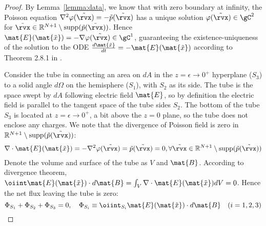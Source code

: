 \begin{proof}

{By Lemma~\ref{lemma:data}, we know that with zero boundary at infinity, the Poisson equation $\nabla^2\varphi(\tilde{\rvx})=-\tilde{p}(\tilde{\rvx})$ has a unique solution $\varphi(\tilde{\rvx}) \in \gC^2$ for $\tilde{\rvx} \in \mathbb{R}^{N+1} \setminus \textrm{supp}(\tilde{p}(\tilde{\rvx}))$. Hence $\mat{E}(\mat{\tilde{x}})= -\nabla \varphi(\tilde{\rvx}) \in \gC^1$, guaranteeing the existence-uniqueness of the solution to the ODE $\frac{d\mat{\tilde{x}}}{dt}=-\mat{E}(\mat{\tilde{x}})$ according to Theorem 2.8.1 in \cite{Ricardo2002AMI}.}

Consider the tube in  connecting an area on $dA$ in the $z=\epsilon\to 0^+$ hyperplane ($S_3$) to a solid angle $d\Omega$ on the hemisphere ($S_1$), with $S_2$ as its side. The tube is the space swept by $dA$ following electric field $\mat{E}$, so by definition the electric field is parallel to the tangent space of the tube sides $S_2$. The bottom of the tube $S_3$ is located at $z=\epsilon\to 0^+$, a bit above the $z=0$ plane, so the tube does not enclose any charges.  We note that the divergence of Poisson field is zero in $\mathbb{R}^{N+1} \setminus \textrm{supp}(\tilde{p}(\tilde{\rvx}))$:
\begin{align*}
    \nabla\cdot \mat{E}(\mat{\tilde{x}}) = -\nabla^2\varphi(\tilde{\rvx})=\tilde{p}(\tilde{\rvx})=0, \forall \tilde{\rvx} \in \mathbb{R}^{N+1} \setminus \textrm{supp}(\tilde{p}(\tilde{\rvx}))
\end{align*}
Denote the volume and surface of the tube as $V$ and $\mat{B}$. According to divergence theorem, $ \oiint \mat{E}(\mat{\tilde{x}})\cdot d\mat{B}=\int_V \nabla\cdot \mat{E}(\mat{\tilde{x}}) dV=0$. Hence the net flux leaving the tube is zero:
\begin{equation}\label{eq:tube_zeronetflux}
    \Phi_{S_1} + \Phi_{S_2} + \Phi_{S_3} = 0, \quad
    \Phi_{S_i} \equiv \oiint_{S_i} \mat{E}(\mat{\tilde{x}})\cdot d\mat{B} \quad (i=1,2,3)
\end{equation}



\end{proof}
